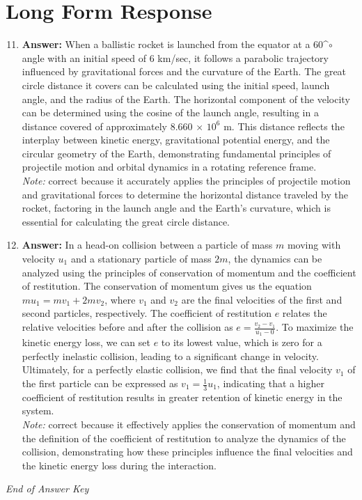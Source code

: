 \documentclass[12pt]{article}
\begin{document}
\section*{Long Form Response}
\begin{enumerate}[label=\arabic*.]
\setcounter{enumi}{10}
\item \textbf{Answer:} When a ballistic rocket is launched from the equator at a 60^\ensuremath{\circ} angle with an initial speed of 6 km/sec, it follows a parabolic trajectory influenced by gravitational forces and the curvature of the Earth. The great circle distance it covers can be calculated using the initial speed, launch angle, and the radius of the Earth. The horizontal component of the velocity can be determined using the cosine of the launch angle, resulting in a distance covered of approximately 8.660 \ensuremath{\times} $10^6$ m. This distance reflects the interplay between kinetic energy, gravitational potential energy, and the circular geometry of the Earth, demonstrating fundamental principles of projectile motion and orbital dynamics in a rotating reference frame.
\\ \textit{Note:} correct because it accurately applies the principles of projectile motion and gravitational forces to determine the horizontal distance traveled by the rocket, factoring in the launch angle and the Earth's curvature, which is essential for calculating the great circle distance.
\item \textbf{Answer:} In a head-on collision between a particle of mass \( m \) moving with velocity \( u_1 \) and a stationary particle of mass \( 2 m \), the dynamics can be analyzed using the principles of conservation of momentum and the coefficient of restitution. The conservation of momentum gives us the equation \( mu_1 = mv_1 + 2 mv_2 \), where \( v_1 \) and \( v_2 \) are the final velocities of the first and second particles, respectively. The coefficient of restitution \( e \) relates the relative velocities before and after the collision as \( e = \frac{v_2 - v_1}{u_1 - 0} \). To maximize the kinetic energy loss, we can set \( e \) to its lowest value, which is zero for a perfectly inelastic collision, leading to a significant change in velocity. Ultimately, for a perfectly elastic collision, we find that the final velocity \( v_1 \) of the first particle can be expressed as \( v_1 = \frac{1}{3}u_1 \), indicating that a higher coefficient of restitution results in greater retention of kinetic energy in the system.
\\ \textit{Note:} correct because it effectively applies the conservation of momentum and the definition of the coefficient of restitution to analyze the dynamics of the collision, demonstrating how these principles influence the final velocities and the kinetic energy loss during the interaction.
\end{enumerate}

\vfill
\noindent\textit{End of Answer Key}
\end{document}
